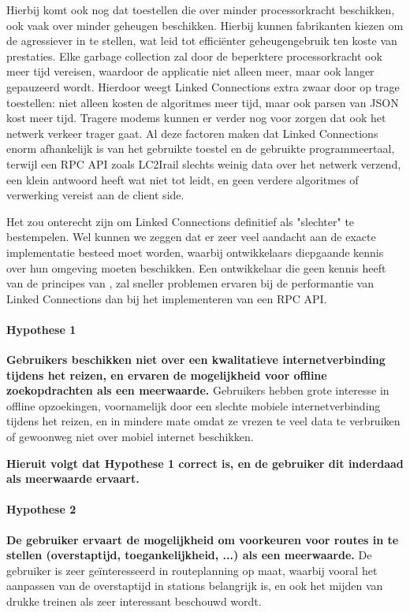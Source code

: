 Hierbij komt ook nog dat toestellen die over minder processorkracht beschikken, ook vaak over minder geheugen beschikken. Hierbij kunnen fabrikanten kiezen om de  agressiever in te stellen, wat leid tot efficiënter geheugengebruik ten koste van prestaties. %
Elke garbage collection zal door de beperktere processorkracht ook meer tijd vereisen, waardoor de applicatie niet alleen meer, maar ook langer gepauzeerd wordt. Hierdoor weegt Linked Connections extra zwaar door op trage toestellen: niet alleen kosten de algoritmes meer tijd, maar ook parsen van JSON kost meer tijd. Tragere modems kunnen er verder nog voor zorgen dat ook het netwerk verkeer trager gaat. Al deze factoren maken dat Linked Connections enorm afhankelijk is van het gebruikte toestel en de gebruikte programmeertaal, terwijl een RPC API zoals LC2Irail slechts weinig data over het netwerk verzend, een klein antwoord heeft wat niet tot  leidt, en geen verdere algoritmes of verwerking vereist aan de client side. 

Het zou onterecht zijn om Linked Connections definitief als "slechter" te bestempelen. Wel kunnen we zeggen dat er zeer veel aandacht aan de exacte implementatie besteed moet worden, waarbij ontwikkelaars diepgaande kennis over hun omgeving moeten beschikken. Een ontwikkelaar die geen kennis heeft van de principes van , zal sneller problemen ervaren bij de performantie van Linked Connections dan bij het implementeren van een RPC API.

\paragraph{Hypothese 1} \textbf{Gebruikers beschikken niet over een kwalitatieve internetverbinding tijdens het reizen, en ervaren de mogelijkheid voor offline zoekopdrachten als een meerwaarde.}
	Gebruikers hebben grote interesse in offline opzoekingen, voornamelijk door een slechte mobiele internetverbinding tijdens het reizen, en in mindere mate omdat ze vrezen te veel data te verbruiken of gewoonweg niet over mobiel internet beschikken.
	
\textbf{Hieruit volgt dat Hypothese 1 correct is, en de gebruiker dit inderdaad als meerwaarde ervaart.}

\paragraph{Hypothese 2}\textbf{De gebruiker ervaart de mogelijkheid om voorkeuren voor routes in te stellen (overstaptijd, toegankelijkheid, ...) als een meerwaarde.}
	De gebruiker is zeer geïnteresseerd in routeplanning op maat, waarbij vooral het aanpassen van de overstaptijd in stations belangrijk is, en ook het mijden van drukke treinen als zeer interessant beschouwd wordt.

